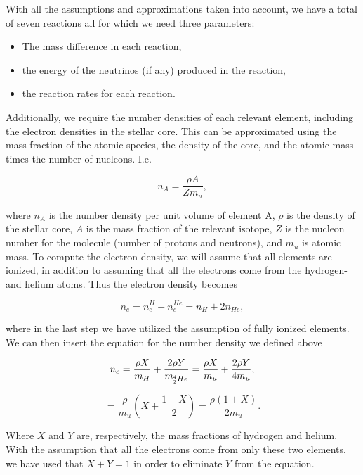 \documentclass[a4paper,10pt,english]{article}
\begin{document}
With all the assumptions and approximations taken into account, we have a total of seven reactions all for which we need three parameters:

\begin{itemize}
    \item The mass difference in each reaction,
    \item the energy of the neutrinos (if any) produced in the reaction,
    \item the reaction rates for each reaction.
\end{itemize}

Additionally, we require the number densities of each relevant element, including the electron densities in the stellar core. This can be approximated using the mass fraction of the atomic species, the density of the core, and the atomic mass times the number of nucleons. I.e.

$$n_A = \frac{\rho A}{Zm_u},$$

where $n_A$ is the number density per unit volume of element A, $\rho$ is the density of the stellar core, $A$ is the mass fraction of the relevant isotope, $Z$ is the nucleon number for the molecule (number of protons and neutrons), and $m_u$ is atomic mass. To compute the electron density, we will assume that all elements are ionized, in addition to assuming that all the electrons come from the hydrogen- and helium atoms. Thus the electron density becomes

$$n_e = n_e^H + n_e^{He} = n_H + 2n_{He},$$

where in the last step we have utilized the assumption of fully ionized elements. We can then insert the equation for the number density we defined above

$$n_e = \frac{\rho X}{m_H} + \frac{2\rho Y}{m_{\prescript{4}{2}{He}} }  = \frac{\rho X}{m_u} + \frac{2\rho Y}{4m_u},$$

$$= \frac{\rho}{m_u}\left(X + \frac{1-X}{2}\right) = \frac{\rho(1 + X)}{2m_u}.$$

Where $X$ and $Y$ are, respectively, the mass fractions of hydrogen and helium. With the assumption that all the electrons come from only these two elements, we have used that $X + Y = 1$ in order to eliminate $Y$ from the equation. 
\end{document}

